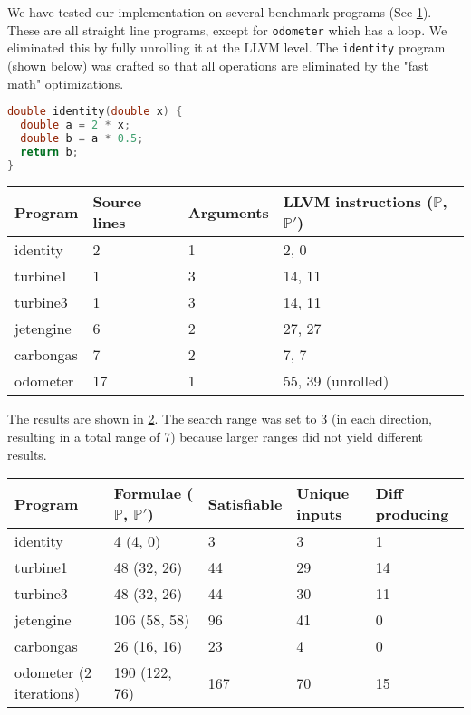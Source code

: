 \documentclass{article}
\begin{document}
We have tested our implementation on several benchmark programs (See
\ref{table:benchmarks}). These are all straight line programs, except for
\texttt{odometer} which has a loop. We eliminated this by fully unrolling it at
the LLVM level. The \texttt{identity} program (shown below) was crafted so that
all operations are eliminated by the "fast math" optimizations.

\begin{lstlisting}[language=C]
double identity(double x) {
  double a = 2 * x;
  double b = a * 0.5;
  return b;
}
\end{lstlisting}

\begin{table}[h]
\begin{tabular}{l|lll}
Program   & Source lines & Arguments & LLVM instructions ($\mathbb{P}$,
  $\mathbb{P'}$) \\ \hline
identity  & 2            & 1         & 2, 0                      \\
turbine1  & 1            & 3         & 14, 11                    \\
turbine3  & 1            & 3         & 14, 11                    \\
jetengine & 6            & 2         & 27, 27                    \\
carbongas & 7            & 2         & 7, 7                      \\
odometer  & 17           & 1         & 55, 39 (unrolled)
\end{tabular}
\label{table:benchmarks}
\end{table}

The results are shown in \ref{table:results}. The search range was set to 3 (in
each direction, resulting in a total range of 7) because larger ranges did not
yield different results.

\begin{table}[h]
\begin{tabular}{l|llll}
Program                   & Formulae ($\mathbb{P}$, $\mathbb{P'}$) &
  Satisfiable & Unique inputs & Diff producing \\ \hline
identity                  & 4 (4, 0)            & 3           & 3             &
1              \\
turbine1                  & 48 (32, 26)         & 44          & 29            & 14             \\
turbine3                  & 48 (32, 26)         & 44          & 30            & 11             \\
jetengine                 & 106 (58, 58)        & 96          & 41            & 0              \\
carbongas                 & 26 (16, 16)         & 23          & 4             & 0              \\
odometer (2 iterations)   & 190 (122, 76)       & 167         & 70            &
15
\end{tabular}
\label{table:results}
\end{table}
\end{document}
